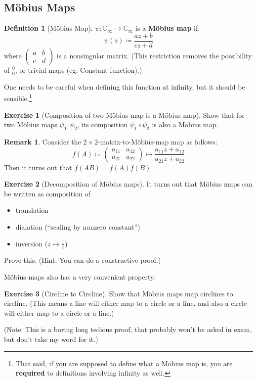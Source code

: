 \documentclass[a4paper, 12pt]{article}
\theoremstyle{definition}
\newtheorem{definition}{Definition}
\newtheorem{exercise}{Exercise}
\newtheorem{remark}{Remark}
\numberwithin{definition}{section}
\numberwithin{exercise}{section}
\numberwithin{remark}{section}
\numberwithin{figure}{section}
\newcommand{\C}{\mathbb{C}}
\begin{document}
\subsection{M\"obius Maps}
\begin{definition}[M\"obius Map]
    $\psi : \C_{\infty} \rightarrow \C_{\infty}$ is a \textbf{M\"obius map} if:
    \begin{equation*}
        \psi \left( z \right) \coloneqq \frac{az + b}{cz + d}
    \end{equation*}
    where $
    \begin{pmatrix}
        a & b \\ c & d
    \end{pmatrix}
    $ is a nonsingular matrix.
    (This restriction removes the possibility of $\frac{0}{0}$,
    or trivial maps (eg: Constant function).)

    One needs to be careful when defining this function at infinity,
    but it should be sensible.\footnote{
    That said, if you are supposed to define what a M\"obius map is,
    you are \textbf{required} to definitions involving infinity as well.
    }
\end{definition}
\begin{exercise}[Composition of two M\"obius map is a M\"obius map]
    Show that for two M\"obius maps $\psi_1, \psi_2$,
    its composition $\psi_1 \circ \psi_2$ is also a M\"obius map.
\end{exercise}
\begin{remark}
    Consider the $2 \times 2$-matrix-to-M\"obius-map map as follows:
    \begin{equation*}
        f (A) \coloneqq
        \begin{pmatrix}
            a_{11} & a_{12} \\ a_{21} & a_{22}
        \end{pmatrix}
        \mapsto
        \frac{a_{11} z + a_{12}}{a_{21} z + a_{22}}
    \end{equation*}
    Then it turns out that
    $f\left( AB \right) = f(A) f(B)$
\end{remark}
\begin{exercise}[Decomposition of M\"obius maps]
    It turns out that M\"obius maps can be written as composition of
    \begin{itemize}
        \item translation
        \item dialation (``scaling by nonzero constant'')
        \item inversion ($z \mapsto \frac{1}{z}$)
    \end{itemize}
    Prove this. (Hint: You can do a constructive proof.)
\end{exercise}
M\"obius maps also has a very convenient property:
\begin{exercise}[Circline to Circline]
    Show that M\"obius maps map circlines to circline.
    (This means a line will either map to a circle or a line,
    and also a circle will either map to a circle or a line.)

    (Note: This is a boring long tedious proof, that probably won't be asked in exam,
    but don't take my word for it.)
\end{exercise}
\end{document}
